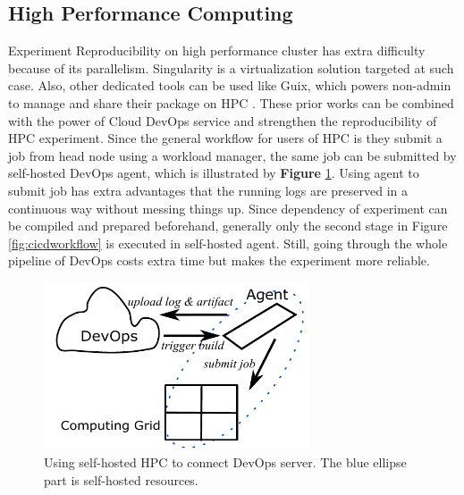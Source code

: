 \documentclass{IEEEcsmag}
\begin{document}

\subsection{High Performance Computing}
Experiment Reproducibility on high performance cluster has extra difficulty because of its parallelism. Singularity is a virtualization solution targeted at such case. %
Also, other dedicated tools can be used like Guix, which powers non-admin to manage and share their package on HPC \cite{courtes2015reproducible}. These prior works can be combined with the power of Cloud DevOps service and strengthen the reproducibility of HPC experiment. Since the general workflow for users of HPC is they submit a job from head node using a workload manager, the same job can be submitted by self-hosted DevOps agent, which is illustrated by {\bf Figure} \ref{fig:selfhosted}. Using agent to submit job has extra advantages that the running logs are preserved in a continuous way without messing things up. Since dependency of experiment can be compiled and prepared beforehand, generally only the second stage in Figure \ref{fig:cicdworkflow}
is executed in self-hosted agent. Still, going through the whole pipeline of DevOps costs extra time but makes the experiment more reliable.

\begin{figure}[!ht]
\centerline{\includegraphics[width=18.5pc]{self-hosted.pdf}}
\caption{Using self-hosted HPC to connect DevOps server. The blue ellipse part is self-hosted resources.}\label{fig:selfhosted}
\end{figure}
\end{document}

